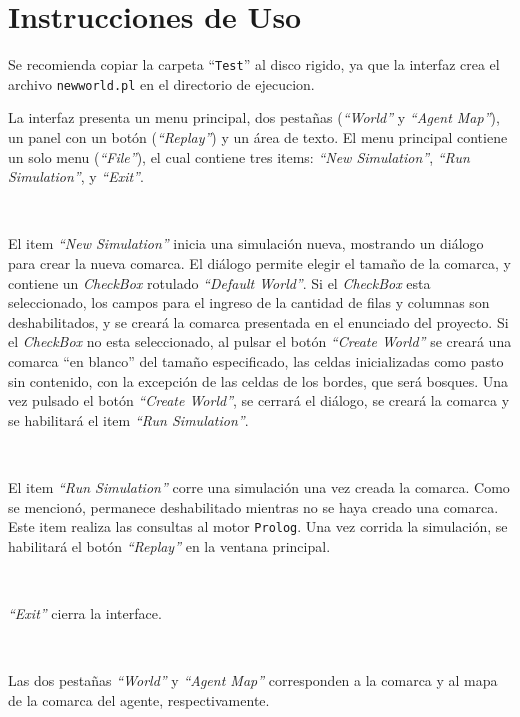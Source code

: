 \documentclass[a4paper,12pt]{report}
\begin{document}
\section{Instrucciones de Uso}

Se recomienda copiar la carpeta ``\texttt{Test}'' al disco rigido, ya que la interfaz crea el archivo
\texttt{newworld.pl} en el directorio de ejecucion.

La interfaz presenta un menu principal, dos pesta\~{n}as (\textit{``World''} y \textit{``Agent Map''}), un panel con un
bot\'{o}n (\textit{``Replay''}) y un \'{a}rea de texto.
El menu principal contiene un solo menu (\textit{``File''}), el cual contiene tres items: \textit{``New Simulation''},
\textit{``Run Simulation''}, y \textit{``Exit''}.

\

El item \textit{``New Simulation''} inicia una simulaci\'{o}n nueva, mostrando un di\'{a}logo para crear la nueva
comarca.
El di\'{a}logo permite elegir el tama\~{n}o de la comarca, y contiene un \textit{CheckBox} rotulado \textit{``Default
World''}.
Si el \textit{CheckBox} esta seleccionado, los campos para el ingreso de la cantidad de filas y columnas son
deshabilitados, y se crear\'{a} la comarca presentada en el enunciado del proyecto.
Si el \textit{CheckBox} no esta seleccionado, al pulsar el bot\'{o}n \textit{``Create World''} se crear\'{a} una comarca
``en blanco'' del tama\~{n}o especificado, las celdas inicializadas como pasto sin contenido, con la excepci\'{o}n de las
celdas de los bordes, que ser\'{a} bosques.
Una vez pulsado el bot\'{o}n \textit{``Create World''}, se cerrar\'{a} el di\'{a}logo, se crear\'{a} la comarca y se
habilitar\'{a} el item \textit{``Run Simulation''}.

\

El item \textit{``Run Simulation''} corre una simulaci\'{o}n una vez creada la comarca.
Como se mencion\'{o}, permanece deshabilitado mientras no se haya creado una comarca.
Este item realiza las consultas al motor \texttt{Prolog}.
Una vez corrida la simulaci\'{o}n, se habilitar\'{a} el bot\'{o}n \textit{``Replay''} en la ventana principal.

\

\textit{``Exit''} cierra la interface.

\

Las dos pesta\~{n}as \textit{``World''} y \textit{``Agent Map''} corresponden a la comarca y al mapa de la comarca del
agente, respectivamente.

\
\end{document}
